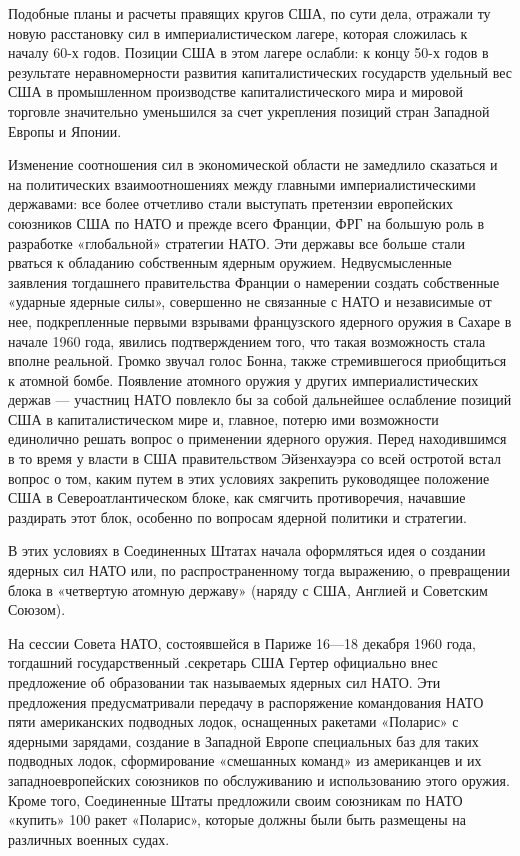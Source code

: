 \documentclass[12pt, a4paper, openany]{book}
\begin{document}
	Подобные планы и расчеты правящих кругов США, по сути дела, отражали ту новую расстановку сил в империалистическом лагере, которая сложилась к началу 60-х годов. Позиции США в этом лагере ослабли: к концу 50-х годов в результате неравномерности развития капиталистических государств удельный вес США в промышленном производстве капиталистического мира и мировой торговле значительно уменьшился за счет укрепления позиций стран Западной Европы и Японии.
	
	Изменение соотношения сил в экономической области не замедлило сказаться и на политических взаимоотношениях между главными империалистическими державами: все более отчетливо стали выступать претензии европейских союзников США по НАТО и прежде всего Франции, ФРГ на большую роль в разработке «глобальной» стратегии НАТО. Эти державы все больше стали рваться к обладанию собственным ядерным оружием. Недвусмысленные заявления тогдашнего правительства Франции о намерении создать собственные «ударные ядерные силы», совершенно не связанные с НАТО и независимые от нее, подкрепленные первыми взрывами французского ядерного оружия в Сахаре в начале 1960 года, явились подтверждением того, что такая возможность стала вполне реальной. Громко звучал голос Бонна, также стремившегося приобщиться к атомной бомбе. Появление атомного оружия у других империалистических держав — участниц НАТО повлекло бы за собой дальнейшее ослабление позиций США в капиталистическом мире и, главное, потерю ими возможности единолично решать вопрос о применении ядерного оружия. Перед находившимся в то время у власти в США правительством Эйзенхауэра со всей остротой встал вопрос о том, каким путем в этих условиях закрепить руководящее положение США в Североатлантическом блоке, как смягчить противоречия, начавшие раздирать этот блок, особенно по вопросам ядерной политики и стратегии.
	
	
	
	В этих условиях в Соединенных Штатах начала оформляться идея о создании ядерных сил НАТО или, по распространенному тогда выражению, о превращении блока в «четвертую атомную державу» (наряду с США, Англией и Советским Союзом).
	
	На сессии Совета НАТО, состоявшейся в Париже 16—18 декабря 1960 года, тогдашний государственный .секретарь США Гертер официально внес предложение об образовании так называемых ядерных сил НАТО. Эти предложения предусматривали передачу в распоряжение командования НАТО пяти американских подводных лодок, оснащенных ракетами «Поларис» с ядерными зарядами, создание в Западной Европе специальных баз для таких подводных лодок, сформирование «смешанных команд» из американцев и их западноевропейских союзников по обслуживанию и использованию этого оружия. Кроме того, Соединенные Штаты предложили своим союзникам по НАТО «купить» 100 ракет «Поларис», которые должны были быть размещены на различных военных судах.
	
\end{document}
